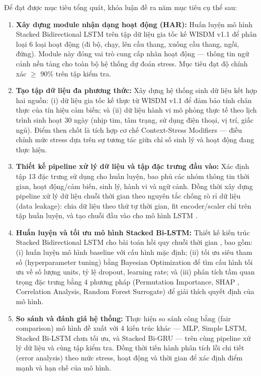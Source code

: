 Để đạt được mục tiêu tổng quát, khóa luận đề ra năm mục tiêu cụ thể sau:

\begin{enumerate}
    \item \textbf{Xây dựng module nhận dạng hoạt động (HAR):} Huấn luyện mô hình Stacked Bidirectional LSTM trên tập dữ liệu gia tốc kế WISDM v1.1 \cite{kwapisz2010activity} để phân loại 6 loại hoạt động (đi bộ, chạy, lên cầu thang, xuống cầu thang, ngồi, đứng). Module này đóng vai trò cung cấp nhãn hoạt động — thông tin ngữ cảnh nền tảng cho toàn bộ hệ thống dự đoán stress. Mục tiêu đạt độ chính xác $\geq$ 90\% trên tập kiểm tra.
    
    \item \textbf{Tạo tập dữ liệu đa phương thức:} Xây dựng hệ thống sinh dữ liệu kết hợp hai nguồn: (i) dữ liệu gia tốc kế thực từ WISDM v1.1 để đảm bảo tính chân thực của tín hiệu cảm biến; và (ii) dữ liệu hành vi mô phỏng thực tế theo lịch trình sinh hoạt 30 ngày (nhịp tim, tâm trạng, sử dụng điện thoại, vị trí, giấc ngủ). Điểm then chốt là tích hợp cơ chế Context-Stress Modifiers — điều chỉnh mức stress dựa trên sự tương tác giữa chỉ số sinh lý và hoạt động đang thực hiện.
    
    \item \textbf{Thiết kế pipeline xử lý dữ liệu và tập đặc trưng đầu vào:} Xác định tập 13 đặc trưng sử dụng cho huấn luyện, bao phủ các nhóm thông tin thời gian, hoạt động/cảm biến, sinh lý, hành vi và ngữ cảnh. Đồng thời xây dựng pipeline xử lý dữ liệu chuỗi thời gian theo nguyên tắc chống rò rỉ dữ liệu (data leakage): chia dữ liệu theo thứ tự thời gian, fit encoder/scaler chỉ trên tập huấn luyện, và tạo chuỗi đầu vào cho mô hình LSTM \cite{kaufman2012leakage}.
    
    \item \textbf{Huấn luyện và tối ưu mô hình Stacked Bi-LSTM:} Thiết kế kiến trúc Stacked Bidirectional LSTM cho bài toán hồi quy chuỗi thời gian \cite{hochreiter1997lstm}, bao gồm: (i) huấn luyện mô hình baseline với cấu hình mặc định; (ii) tối ưu siêu tham số (hyperparameter tuning) bằng Bayesian Optimization \cite{snoek2012practical} để tìm cấu hình tối ưu về số lượng units, tỷ lệ dropout, learning rate; và (iii) phân tích tầm quan trọng đặc trưng bằng 4 phương pháp (Permutation Importance, SHAP \cite{lundberg2017shap}, Correlation Analysis, Random Forest Surrogate) để giải thích quyết định của mô hình.
    
    \item \textbf{So sánh và đánh giá hệ thống:} Thực hiện so sánh công bằng (fair comparison) mô hình đề xuất với 4 kiến trúc khác — MLP, Simple LSTM, Stacked Bi-LSTM chưa tối ưu, và Stacked Bi-GRU \cite{cho2014learning} — trên cùng pipeline xử lý dữ liệu và cùng tập kiểm tra. Đồng thời tiến hành phân tích lỗi chi tiết (error analysis) theo mức stress, hoạt động và thời gian để xác định điểm mạnh và hạn chế của mô hình.
\end{enumerate}

